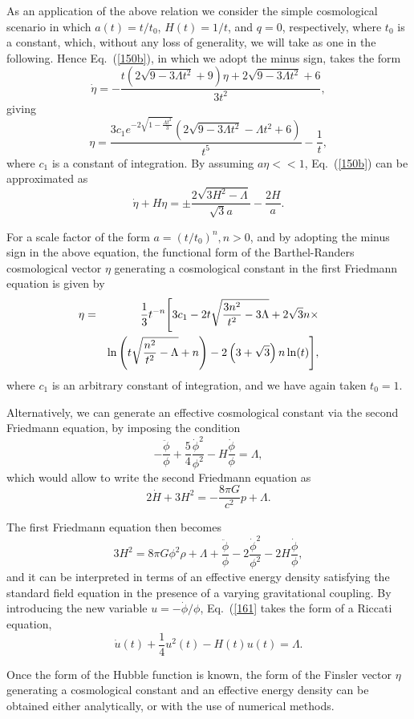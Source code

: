 \documentclass[aps,superscriptaddress, showpacs,preprintnumbers, superscriptaddress, nofootinbibt,twocolumn]{revtex4-2}
\def\be{\begin{equation}}
\def\ee{\end{equation}}
\def\bea{\begin{eqnarray}}
\def\eea{\end{eqnarray}}
\begin{document}
As an application of the above relation we consider the simple cosmological scenario in which $a(t)=t/t_0$, $H(t)=1/t$, and $q=0$, respectively, where $t_0$ is a constant, which, without any loss of generality,  we will take as one in the following. Hence Eq.~(\ref{150b}), in which we adopt the minus sign,  takes the form
\be
\dot{\eta} = -\frac{t  \left(2 \sqrt{9-3 \Lambda  t^2}+9\right)\eta +2
   \sqrt{9-3 \Lambda  t^2}+6}{3 t^2},
\ee
giving
\be
\eta=\frac{3 c_1 e^{-2 \sqrt{1-\frac{\Lambda  t^2}{3}}} \left(2 \sqrt{9-3 \Lambda
   t^2}-\Lambda  t^2+6\right)}{t^5}-\frac{1}{t},
\ee
where $c_1$ is a constant of integration. By assuming $a\eta <<1$, Eq.~(\ref{150b}) can be approximated as
\be
\dot{\eta}+H\eta=\pm\frac{2 \sqrt{3 H^2-\Lambda  }}{\sqrt{3}
   a}-\frac{2 H}{a}.
\ee

For a scale factor of the form $a=\left(t/t_0\right)^{n}, n>0$, and by adopting the minus sign in the above equation, the functional form of the Barthel-Randers cosmological vector $\eta $ generating a cosmological constant in the first Friedmann equation is given by
\bea
\hspace{-0.6cm}\eta &=&\frac{1}{3} t^{-n} \Bigg[3 c_1-2 t \sqrt{\frac{3 n^2}{t^2}-3 \Lambda }+2 \sqrt{3} n \times \nonumber\\
\hspace{-0.6cm}&&\ln
   \left(t \sqrt{\frac{n^2}{t^2}-\Lambda }+n\right)-2 \left(3+\sqrt{3}\right) n \ln
   (t)\Bigg],
\eea
where $c_1$ is an arbitrary constant of integration, and we have again taken $t_0=1$.

Alternatively, we can generate an effective cosmological constant via the second Friedmann equation, by imposing the condition
\be\label{161}
-\frac{\ddot{\phi}}{\phi}+\frac{5}{4}\frac{\dot{\phi}^2}{\phi ^2}-H\frac{\dot{\phi}}{\phi}=\Lambda,
\ee
which would allow to write the second Friedmann equation as
\be
2\dot{H}+3H^2=-\frac{8\pi G}{c^2}p+\Lambda.
\ee

The first Friedmann equation then becomes
\be
3H^2=8\pi G\phi^2\rho +\Lambda +\frac{\ddot{\phi}}{\phi}-2\frac{\dot{\phi}^2}{\phi ^2}-2H\frac{\dot{\phi}}{\phi},
\ee
and it can be interpreted in terms of an effective energy density satisfying the standard field equation in the presence of a varying gravitational coupling.  By introducing the new variable $u=-\dot{\phi}/\phi$, Eq.~(\ref{161} takes the form of a Riccati equation,
\be
\dot{u}(t)+\frac{1}{4}u^2(t)-H(t)u(t)=\Lambda.
\ee

Once the form of the Hubble function is known, the form of the Finsler vector $\eta$ generating a cosmological constant and an effective energy density can be obtained either analytically, or with the use of numerical methods.
\end{document}
